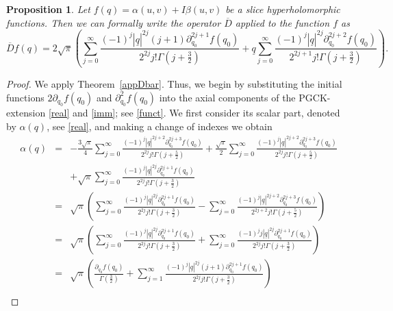 \documentclass[reqno,11pt]{amsart}
\numberwithin{equation}{section}
\newtheorem{proposition}[theorem]{Proposition}
\theoremstyle{definition}
\begin{document}
\begin{proposition}
	Let $f(q)=\alpha(u,v)+I \beta(u,v)$ be a slice hyperholomorphic functions. Then we can formally write the operator $\overline{D}$ applied to the function $f$ as
$$
		\overline{D}f(q)=2\sqrt{\pi}\left(\sum_{j=0}^\infty \frac{(-1)^j | \underline{q}|^{2j} (j+1) \partial_{q_0}^{2j+1}f(q_0)}{2^{2j}j! \Gamma \left(j+\frac{3}{2}\right)}+ \underline{q} \sum_{j=0}^\infty \frac{(-1)^j  |\underline{q}|^{2j}  \partial_{q_0}^{2j+2}f(q_0)}{2^{2j+1} j! \Gamma \left(j+\frac{3}{2}\right)} \right).
$$
\end{proposition}
\begin{proof}

We apply Theorem~\ref{appDbar}. Thus, we begin by substituting the initial functions  $2\partial_{q_0}f(q_0)$ and $\partial_{q_0}^2 f(q_0)$ into the axial components of the PGCK-extension \eqref{real} and \eqref{imm}; see \eqref{funct}. We first consider its scalar part, denoted by $\alpha(q)$, see \eqref{real}, and making a change of indexes we obtain
			\begingroup\allowdisplaybreaks
	\begin{eqnarray}
		\nonumber
		\alpha(q)&=&- \frac{3 \sqrt{\pi}}{4} \sum_{j=0}^\infty \frac{(-1)^j | \underline{q}|^{2j+2} \partial_{q_0}^{2j+3}f(q_0)}{2^{2j}j! \Gamma \left(j+\frac{5}{2}\right)}+ \frac{\sqrt{\pi}}{2} \sum_{j=0}^\infty \frac{(-1)^j |\underline{q}|^{2j+2} \partial_{q_0}^{2j+3}f(q_0)}{2^{2j}j! \Gamma \left(j+\frac{5}{2}\right)}\\
		\nonumber
		&& +\sqrt{\pi} \sum_{j=0}^\infty \frac{(-1)^j | \underline{q}|^{2j} \partial_{q_0}^{2j+1} f(q_0)}{2^{2j}j! \Gamma \left(j+\frac{3}{2}\right)}\\
		\nonumber
		&=& \sqrt{\pi} \left( \sum_{j=0}^\infty \frac{(-1)^j | \underline{q}|^{2j} \partial_{q_0}^{2j+1}f(q_0)}{2^{2j} j! \Gamma \left(j+\frac{3}{2}\right)}- \sum_{j=0}^\infty \frac{(-1)^j | \underline{q}|^{2j+2} \partial_{q_0}^{2j+3}f(q_0)}{2^{2j+2} j! \Gamma \left(j+\frac{5}{2}\right)}\right)\\
			\nonumber
		&=& \sqrt{\pi} \left( \sum_{j=0}^\infty \frac{(-1)^j | \underline{q}|^{2j} \partial_{q_0}^{2j+1}f(q_0)}{2^{2j} j! \Gamma \left(j+\frac{3}{2}\right)}+ \sum_{j=0}^\infty \frac{(-1)^j j | \underline{q}|^{2j} \partial_{q_0}^{2j+1}f(q_0)}{2^{2j} j! \Gamma \left(j+\frac{3}{2}\right)}\right)\\
		\nonumber
		&=& \sqrt{\pi} \left(\frac{\partial_{q_0} f(q_0)}{\Gamma \left(\frac{3}{2}\right)}+ \sum_{j=1}^\infty \frac{(-1)^j | \underline{q}|^{2j} (j+1) \partial_{q_0}^{2j+1}f(q_0)}{2^{2j}j! \Gamma \left(j+\frac{3}{2}\right)}\right)\\

\end{eqnarray}
\end{proof}
\end{document}
